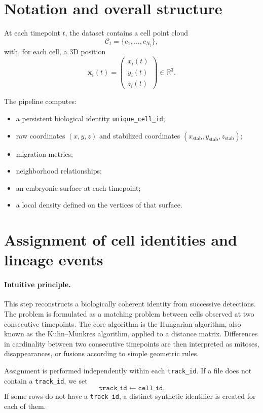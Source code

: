\documentclass[11pt,a4paper]{article}
\begin{document}
\tableofcontents

\section{Notation and overall structure}

At each timepoint $t$, the dataset contains a cell point cloud
\[
\mathcal{C}_t=\{c_1,\dots,c_{N_t}\},
\]
with, for each cell, a 3D position
\[
\mathbf{x}_i(t)=
\begin{pmatrix}
x_i(t)\\
y_i(t)\\
z_i(t)
\end{pmatrix}\in\mathbb{R}^3.
\]

The pipeline computes:
\begin{itemize}
  \item a persistent biological identity \texttt{unique\_cell\_id};
  \item raw coordinates $(x,y,z)$ and stabilized coordinates $(x_{\mathrm{stab}},y_{\mathrm{stab}},z_{\mathrm{stab}})$;
  \item migration metrics;
  \item neighborhood relationships;
  \item an embryonic surface at each timepoint;
  \item a local density defined on the vertices of that surface.
\end{itemize}

\section{Assignment of cell identities and lineage events}

\paragraph{Intuitive principle.}
This step reconstructs a biologically coherent identity from successive detections. The problem is formulated as a matching problem between cells observed at two consecutive timepoints. The core algorithm is the Hungarian algorithm, also known as the Kuhn--Munkres algorithm, applied to a distance matrix. Differences in cardinality between two consecutive timepoints are then interpreted as mitoses, disappearances, or fusions according to simple geometric rules.

Assignment is performed independently within each \texttt{track\_id}. If a file does not contain a \texttt{track\_id}, we set
\[
\texttt{track\_id} \leftarrow \texttt{cell\_id}.
\]
If some rows do not have a \texttt{track\_id}, a distinct synthetic identifier is created for each of them.
\end{document}

